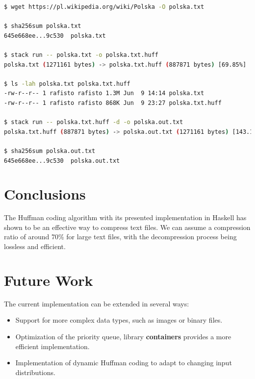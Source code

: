 \documentclass{article}
\begin{document}
\begin{lstlisting}[language=bash]
$ wget https://pl.wikipedia.org/wiki/Polska -O polska.txt

$ sha256sum polska.txt
645e668ee...9c530  polska.txt

$ stack run -- polska.txt -o polska.txt.huff
polska.txt (1271161 bytes) -> polska.txt.huff (887871 bytes) [69.85%]

$ ls -lah polska.txt polska.txt.huff
-rw-r--r-- 1 rafisto rafisto 1.3M Jun  9 14:14 polska.txt
-rw-r--r-- 1 rafisto rafisto 868K Jun  9 23:27 polska.txt.huff

$ stack run -- polska.txt.huff -d -o polska.out.txt
polska.txt.huff (887871 bytes) -> polska.out.txt (1271161 bytes) [143.17%]

$ sha256sum polska.out.txt 
645e668ee...9c530  polska.out.txt
\end{lstlisting}

\section{Conclusions}

The Huffman coding algorithm with its presented implementation in Haskell has shown to be an effective way to compress text files.
We can assume a compression ratio of around 70\% for large text files, with the decompression process being lossless and efficient.

\section{Future Work}

The current implementation can be extended in several ways:
\begin{itemize}
    \item Support for more complex data types, such as images or binary files.
    \item Optimization of the priority queue, library \textbf{containers} provides a more efficient implementation.
    \item Implementation of dynamic Huffman coding to adapt to changing input distributions.
\end{itemize}



\end{document}
